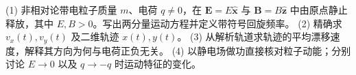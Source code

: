 (1) 非相对论带电粒子质量 \(m\)、电荷 \(q\ne0\)，在 \(\mathbf E=E\hat{\mathbf x}\) 与 \(\mathbf B=B\hat{\mathbf z}\) 中由原点静止释放，其中 \(E,B>0\)。写出两分量运动方程并定义带符号回旋频率。
(2) 精确求 \(v_x(t),v_y(t)\) 及二维轨迹 \(x(t),y(t)\)。
(3) 从解析轨道求轨迹的平均漂移速度，解释其方向为何与电荷正负无关。
(4) 以静电场做功直接核对粒子动能；分别讨论 \(E\to0\) 以及 \(q\to-q\) 时运动特征的变化。
